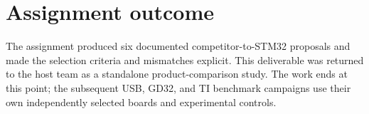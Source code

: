 \section{Assignment outcome}
\label{sec:cascade-equivalence-outcome}

The assignment produced six documented competitor-to-STM32 proposals and made the
selection criteria and mismatches explicit. This deliverable was returned to the host team
as a standalone product-comparison study. The work ends at this point; the subsequent USB,
GD32, and TI benchmark campaigns use their own independently selected boards and
experimental controls.